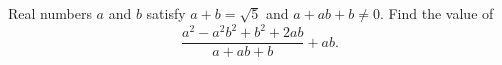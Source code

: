 Real numbers $a$ and $b$ satisfy $a+b=\sqrt5$ and $a+ab+b\ne0$. Find the value of
\[\dfrac{a^2-a^2b^2+b^2+2ab}{a+ab+b}+ab .\]
